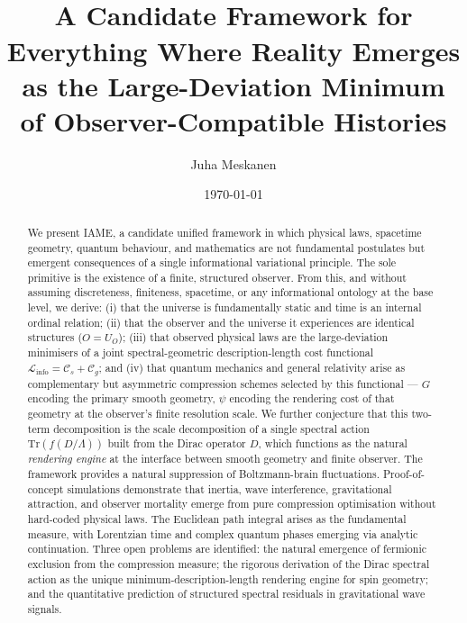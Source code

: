 \documentclass[12pt,a4paper]{article}
\title{\textbf{\iame}\\[0.5em]
\large A Candidate Framework for Everything Where Reality Emerges\\
as the Large-Deviation Minimum of Observer-Compatible Histories}
\author{Juha Meskanen}
\date{\today}
\newcommand{\iame}{\textsc{IAME}}
\newcommand{\Linfo}{\mathcal{L}_{\mathrm{info}}}
\newcommand{\Cs}{\mathcal{C}_s}
\newcommand{\Cg}{\mathcal{C}_g}
\begin{document}
\maketitle

\begin{abstract}
We present \iame{}, a candidate unified framework in which physical laws,
spacetime geometry, quantum behaviour, and mathematics are not fundamental
postulates but emergent consequences of a single informational variational
principle. The sole primitive is the existence of a finite, structured
observer. From this, and without assuming discreteness, finiteness, spacetime,
or any informational ontology at the base level, we derive: (i) that the
universe is fundamentally static and time is an internal ordinal relation;
(ii) that the observer and the universe it experiences are identical structures
($O = U_O$); (iii) that observed physical laws are the large-deviation
minimisers of a joint spectral-geometric description-length cost functional
$\Linfo = \Cs + \Cg$; and (iv) that quantum mechanics and general relativity
arise as complementary but asymmetric compression schemes selected by this
functional --- $G$ encoding the primary smooth geometry, $\psi$ encoding the
rendering cost of that geometry at the observer's finite resolution scale.
We further conjecture that this two-term decomposition is the scale
decomposition of a single spectral action $\mathrm{Tr}(f(D/\Lambda))$ built
from the Dirac operator $D$, which functions as the natural \emph{rendering
engine} at the interface between smooth geometry and finite observer.
The framework provides a natural suppression of Boltzmann-brain fluctuations.
Proof-of-concept simulations demonstrate that inertia, wave
interference, gravitational attraction, and observer mortality emerge from
pure compression optimisation without hard-coded physical laws. The Euclidean
path integral arises as the fundamental measure, with Lorentzian
time and complex quantum phases emerging via analytic continuation. Three open
problems are identified: the natural emergence of fermionic exclusion from the
compression measure; the rigorous derivation of the Dirac spectral action as
the unique minimum-description-length rendering engine for spin geometry; and
the quantitative prediction of structured spectral residuals in gravitational
wave signals.
\end{abstract}

\tableofcontents
\newpage

\end{document}
